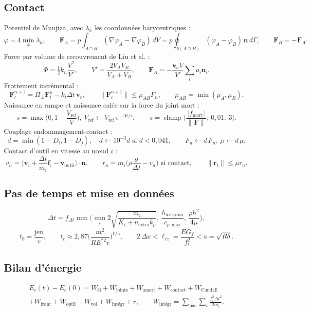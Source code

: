 \subsection{Contact}

Potentiel de Munjiza, avec $\lambda_k$ les coordonnées barycentriques :
\[
\varphi = 4 \min_k \lambda_k, \qquad
\mathbf F_A = p \int_{A\cap B} (\nabla\varphi_A - \nabla\varphi_B)\, dV = p \oint_{\partial(A\cap B)} (\varphi_A - \varphi_B)\, \mathbf n\, d\Gamma, \qquad \mathbf F_B = -\mathbf F_A .
\]
Force par volume de recouvrement de Liu et al. :
\[
\Phi = \tfrac12 k_n \frac{V^2}{V'}, \qquad V' = \frac{2 V_A V_B}{V_A + V_B}, \qquad
\mathbf F_A = -\frac{k_n V}{V'} \sum_{i} a_i \mathbf n_i .
\]
Frottement incrémental :
\[
\mathbf F_t^{n+1} = \Pi_\perp \mathbf F_t^{n} - k_t \Delta t\, \mathbf v_t, \qquad \|\mathbf F_t^{n+1}\| \leq \mu_{AB} F_n, \qquad \mu_{AB} = \min(\mu_A, \mu_B) .
\]
Naissance en rampe et naissance calée sur la force du joint mort :
\[
s = \max\Big(0, 1 - \frac{V_\text{ref}}{V}\Big),\ V_\text{ref} \leftarrow V_\text{ref}\, e^{-\Delta t/\tau} ; \qquad
s = \operatorname{clamp}\Big(\frac{|f_\text{mort}|}{\|\mathbf F\|};\ 0{,}01;\ 3\Big) .
\]
Couplage endommagement-contact :
\[
d = \min(1 - D_i, 1 - D_j), \quad d \leftarrow 10^{-3} d \text{ si } d < 0{,}041, \qquad F_n \leftarrow d\, F_n, \ \mu \leftarrow d\, \mu .
\]
Contact d'outil en vitesse au nœud $i$ :
\[
v_n = \Big(\mathbf v_i + \frac{\Delta t}{m_i}\mathbf f_i - \mathbf v_\text{outil}\Big)\cdot\mathbf n, \qquad
r_n = m_i\Big(\rho \frac{g}{\Delta t} - v_n\Big) \text{ si contact}, \qquad \|\mathbf r_t\| \leq \mu r_n .
\]

\subsection{Pas de temps et mise en données}

\[
\Delta t = f_{\Delta t} \min\Big( \min_i 2\sqrt{\frac{m_i}{K_i + n_\text{extra} k_p}},\ \frac{h_\text{insc,min}}{c_{p,\text{max}}},\ \frac{\rho h^2}{4\mu} \Big),
\]
\[
t_0 = \frac{\text{jeu}}{v}, \qquad t_c \approx 2{,}87 \Big(\frac{m^2}{R E^{*2} v}\Big)^{1/5}, \qquad
2\,\Delta x < \ell_{cz} = \frac{E G_f}{f_t^2} < a = \sqrt{R\delta} .
\]

\subsection{Bilan d'énergie}

\begin{multline*}
E_c(t) - E_c(0) = W_\text{él} + W_\text{joints} + W_\text{amort} + W_\text{contact} + W_\text{Cundall} \\
+ W_\text{front} + W_\text{outil} + W_\text{vol} + W_\text{intégr} + r,
\qquad W_\text{intégr} = \sum_{\text{pas}} \sum_i \frac{f_i^2 \Delta t^2}{2 m_i} .
\end{multline*}
